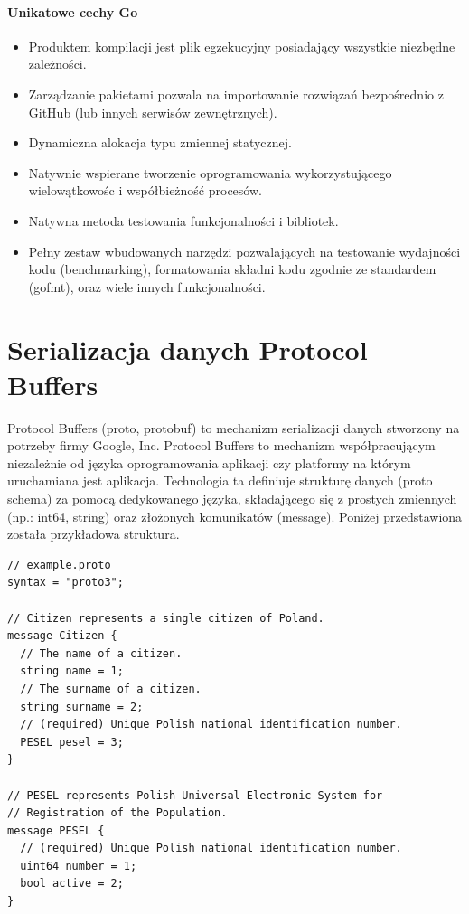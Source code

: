 \documentclass[a4paper,12pt,twoside,openany]{report}
\begin{document}
\paragraph{Unikatowe cechy Go}
\begin{itemize}
 \item Produktem kompilacji jest plik egzekucyjny posiadający wszystkie niezbędne zależności.
 \item Zarządzanie pakietami pozwala na importowanie rozwiązań bezpośrednio z GitHub (lub innych serwisów zewnętrznych).
 \item Dynamiczna alokacja typu zmiennej statycznej.
 \item Natywnie wspierane tworzenie oprogramowania wykorzystującego wielowątkowośc i współbieżność procesów.
 \item Natywna metoda testowania funkcjonalności i bibliotek.
 \item Pełny zestaw wbudowanych narzędzi pozwalających na testowanie wydajności kodu (benchmarking), formatowania składni kodu zgodnie ze standardem (gofmt),
       oraz wiele innych funkcjonalności.
\end{itemize}

\section{Serializacja danych Protocol Buffers}
Protocol Buffers (proto, protobuf) to mechanizm serializacji danych stworzony na potrzeby firmy Google, Inc.
Protocol Buffers to mechanizm współpracującym niezależnie od języka oprogramowania aplikacji czy platformy na którym uruchamiana jest aplikacja.
Technologia ta definiuje strukturę danych (proto schema) za pomocą dedykowanego języka, składającego się z prostych zmiennych (np.: int64, string) 
oraz złożonych komunikatów (message). Poniżej przedstawiona została przykładowa struktura.

\begin{lstlisting}
// example.proto
syntax = "proto3";

// Citizen represents a single citizen of Poland.
message Citizen {
  // The name of a citizen.
  string name = 1;
  // The surname of a citizen.
  string surname = 2;
  // (required) Unique Polish national identification number.
  PESEL pesel = 3;
}

// PESEL represents Polish Universal Electronic System for
// Registration of the Population.
message PESEL {
  // (required) Unique Polish national identification number.
  uint64 number = 1;
  bool active = 2;
}
\end{lstlisting}
\end{document}
